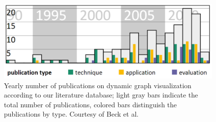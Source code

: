 


\begin{figure}
\centering
\includegraphics[width=1\linewidth]{pictures/collectiveMetaDataExample.png}
\caption{Yearly number of publications on dynamic graph visualization according to our literature database; light gray bars indicate the total number of publications, colored bars distinguish the publications by type. Courtesy of Beck et al.\ \cite{beck2014state} } \label{fig:bar}
\end{figure}


